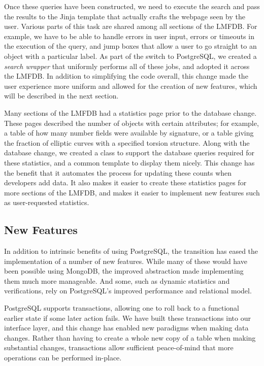 \documentclass{article}
\begin{document}
Once these queries have been constructed, we need to execute the search and pass the results to the Jinja template that actually crafts the webpage seen by the user.
Various parts of this task are shared among all sections of the LMFDB.
For example, we have to be able to handle errors in user input, errors or timeouts in the execution of the query, and jump boxes that allow a user to go straight to an object with a particular label.
As part of the switch to PostgreSQL, we created a \emph{search wrapper} that uniformly performs all of these jobs, and adopted it across the LMFDB.
In addition to simplifying the code overall, this change made the user experience more uniform and allowed for the creation of new features, which will be described in the next section.

Many sections of the LMFDB had a statistics page prior to the database change.
These pages described the number of objects with certain attributes; for example, a table of how many number fields were available by signature, or a table giving the fraction of elliptic curves with a specified torsion structure.
Along with the database change, we created a class to support the database queries required for these statistics, and a common template to display them nicely.
This change has the benefit that it automates the process for updating these counts when developers add data.
It also makes it easier to create these statistics pages for more sections of the LMFDB, and makes it easier to implement new features such as user-requested statistics.

\subsection{New Features}

In addition to intrinsic benefits of using PostgreSQL, the transition has eased the implementation of a number of new features.
While many of these would have been possible using MongoDB, the improved abstraction made implementing them much more manageable.
And some, such as dynamic statistics and verifications, rely on PostgreSQL's improved performance and relational model.

PostgreSQL supports transactions, allowing one to roll back to a functional earlier state if some later action fails.
We have built these transactions into our interface layer, and this change has enabled new paradigms when making data changes.
Rather than having to create a whole new copy of a table when making substantial changes, transactions allow sufficient peace-of-mind that more operations can be performed in-place.
\end{document}
